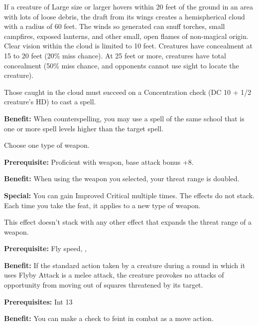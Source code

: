 If a creature of Large size or larger hovers within 20 feet of the ground in an area with lots of loose debris, the draft from its wings creates a hemispherical cloud with a radius of 60 feet. The winds so generated can snuff torches, small campfires, exposed lanterns, and other small, open flames of non-magical origin. Clear vision within the cloud is limited to 10 feet. Creatures have concealment at 15 to 20 feet (20\% miss chance). At 25 feet or more, creatures have total concealment 
(50\% miss chance, and opponents cannot use sight to locate the creature).

Those caught in the cloud must succeed on a Concentration check (DC 10 + 1/2 creature's HD) to cast a spell.


\textbf{Benefit:} When counterspelling, you may use a spell of the same school that is one or more spell levels higher than the target spell.


Choose one type of weapon.

\textbf{Prerequisite:} Proficient with weapon, base attack bonus +8.

\textbf{Benefit:} When using the weapon you selected, your threat range is doubled.

\textbf{Special:} You can gain Improved Critical multiple times. The effects do not stack. Each time you take the feat, it applies to a new type of weapon.

This effect doesn't stack with any other effect that expands the threat range of a weapon.


\textbf{Prerequisite:} Fly speed, , 

\textbf{Benefit:} If the standard action taken by a creature during a round in which it uses Flyby Attack is a melee attack, the creature provokes no attacks of opportunity from moving out of squares threatened by its target.


\textbf{Prerequisites:} Int 13

\textbf{Benefit:} You can make a  check to feint in combat as a move action.


